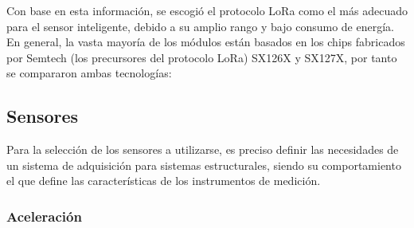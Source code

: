 Con base en esta información, se escogió el protocolo LoRa como el más adecuado para el sensor inteligente, debido a su amplio rango y bajo consumo de energía. En general, la vasta mayoría de los módulos están basados en los chips fabricados por Semtech (los precursores del protocolo LoRa) SX126X y SX127X, por tanto se compararon ambas tecnologías:

\begin{table}[H]
    \centering
    \caption{Comparación entre módulos LoRa del fabricante Semtech \citep{datasheetSemtech}.}
    \label{tab:moduloslora}
    \end{table}

\subsection{Sensores}

Para la selección de los sensores a utilizarse, es preciso definir las necesidades de un sistema de adquisición para sistemas estructurales, siendo su comportamiento el que define las características de los instrumentos de medición.

\subsubsection{Aceleración} 

